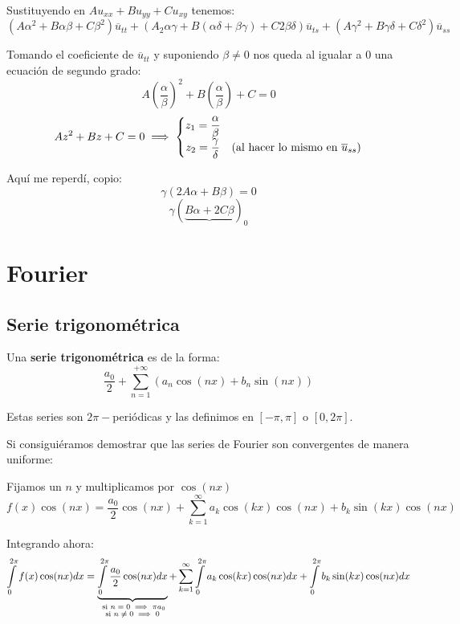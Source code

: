 \documentclass[openany]{book}
\begin{document}
\begin{method}
  Sustituyendo en $ Au_{xx} + Bu_{yy} + Cu_{xy} $ tenemos:
  $$ (A \alpha ^2+B \alpha \beta +C \beta^2)\overline{u}_{tt} + (A_2 \alpha \gamma +B(\alpha \delta + \beta \gamma)+C 2 \beta \delta)\overline{u}_{ts} + (A \gamma ^2  +B\gamma \delta + C \delta ^2 )\overline{u}_{ss}$$

  Tomando el coeficiente de $ \overline{u}_{tt} $ y suponiendo $ \beta \ne 0 $ nos queda al igualar a 0 una ecuación de segundo grado:
  $$ A \left(\dfrac{\alpha}{\beta}\right)^2 + B\left(\dfrac{\alpha}{\beta}\right) +C = 0 $$
  $$ A z^2 +Bz +C  =0 \implies \left\{
  \begin{matrix}
    z_1 = \dfrac{\alpha}{\beta}\\ 
    z_2 = \dfrac{\gamma}{\delta} & (\text{al hacer lo mismo en $ \overline{u}_{ss} $})
  \end{matrix}
  \right. $$

  Aquí me reperdí, copio:
  $$ \gamma(2A \alpha + B \beta) = 0 $$
  $$ \gamma (\underbrace{B \alpha +2C \beta})_{0} $$

\end{method}

\chapter{Fourier}

\section{Serie trigonométrica}

\begin{definition}
  Una \textbf{serie trigonométrica} es de la forma:
  $$ \dfrac{a_0}{2} + \sum\limits_{n=1}^{+\infty} (a_n \cos(nx)+b_n \sin(nx)) $$

  Estas series son $ 2\pi- $periódicas y las definimos en $ [-\pi,\pi] $ o $ [0,2\pi] $.
\end{definition}

Si consiguiéramos demostrar que las series de Fourier son convergentes de manera uniforme:

Fijamos un $ n $ y multiplicamos por $ \cos(nx) $
$$ f(x) \cos(nx) = \dfrac{a_0}{2} \cos(nx) + \sum\limits_{k=1}^{\infty} a_{k}\cos(kx)\cos(nx) + b_{k} \sin(kx) \cos(nx) $$

Integrando ahora:
$$ \int\limits_{0}^{2 \pi} f(x) \cos(nx)dx = \underbrace{\int\limits_{0}^{2 \pi} \dfrac{a_0}{2} \cos(nx) dx}_{\substack{\text{
si $ n = 0 \implies \pi a_0 $}\\\text{si $ n \ne 0 \implies 0 $}}} + \sum\limits_{k=1}^{\infty} \int\limits_{0}^{2 \pi}a_{k}\cos(kx)\cos(nx)dx + \int\limits_{0}^{2 \pi}b_{k} \sin(kx) \cos(nx)dx $$
\end{document}

